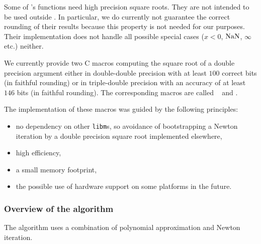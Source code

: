 %
%
%
%


Some of \crlibm's functions need high precision square roots.  They
are not intended to be used outside \crlibm. In particular, we do
currently not guarantee the correct rounding of their results because
this property is not needed for our purposes. Their implementation
does not handle all possible special cases ($x < 0$, $\mathrm{NaN}$, $\infty$
etc.) neither.

We currently provide two C macros computing the square root of a
double precision argument either in double-double precision with at
least $100$ correct bits (in faithful rounding) or in triple-double
precision with an accuracy of at least $146$ bits (in faithful
rounding). The corresponding macros are called \SqrtD~ and
\SqrtT.

The implementation of these macros was guided by the following
principles:
\begin{itemize}
\item no dependency on other \texttt{libm}s, so avoidance of
bootstrapping a Newton iteration by a double precision square root
implemented elsewhere,
\item high efficiency,
\item a small memory footprint,
\item the possible use of hardware support on some platforms in the
future.
\end{itemize}
\subsubsection{Overview of the algorithm}
The algorithm uses a combination of polynomial approximation and
Newton iteration.

